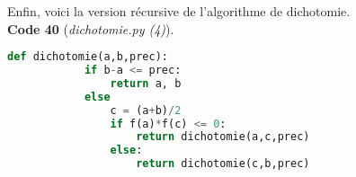 \documentclass[a4paper,12pt]{article}
\begin{document}
    \vspace{0.5cm}

    Enfin, voici la version récursive de l'algorithme de dichotomie. \\
    \textbf{Code 40} (\textit{dichotomie.py (4)}).
    \begin{lstlisting}[language=Python]
        def dichotomie(a,b,prec):
            if b-a <= prec:
                return a, b
            else
                c = (a+b)/2    
                if f(a)*f(c) <= 0:
                    return dichotomie(a,c,prec)
                else:
                    return dichotomie(c,b,prec)
    \end{lstlisting}
\end{document}
